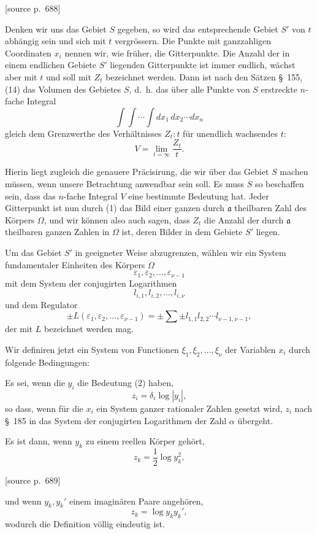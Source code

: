 \documentclass[11pt]{article}
\newcommand{\srcpage}[1]{\par\medskip\noindent\textsf{[source p.~#1]}\par\smallskip}
\begin{document}
\srcpage{688}
Denken wir uns das Gebiet $S$ gegeben, so wird das entsprechende Gebiet $S'$ von $t$ abhängig sein und sich mit $t$ vergrössern. Die Punkte mit ganzzahligen Coordinaten $x_i$ nennen wir, wie früher, die Gitterpunkte. Die Anzahl der in einem endlichen Gebiete $S'$ liegenden Gitterpunkte ist immer endlich, wächst aber mit $t$ und soll mit $Z_t$ bezeichnet werden. Dann ist nach den Sätzen \S~155, (14) das Volumen des Gebietes $S$, d.~h. das über alle Punkte von $S$ erstreckte $n$-fache Integral
\[
\int\!\int\cdots\int dx_1\,dx_2\cdots dx_n
\]
gleich dem Grenzwerthe des Verhältnisses $Z_t:t$ für unendlich wachsendes $t$:
\begin{equation}
V=\lim_{t=\infty}\frac{Z_t}{t}.
\tag{5}
\end{equation}

Hierin liegt zugleich die genauere Präcisirung, die wir über das Gebiet $S$ machen müssen, wenn unsere Betrachtung anwendbar sein soll. Es muss $S$ so beschaffen sein, dass das $n$-fache Integral $V$ eine bestimmte Bedeutung hat. Jeder Gitterpunkt ist nun durch (1) das Bild einer ganzen durch $\mathfrak a$ theilbaren Zahl des Körpers $\Omega$, und wir können also auch sagen, dass $Z_t$ die Anzahl der durch $\mathfrak a$ theilbaren ganzen Zahlen in $\Omega$ ist, deren Bilder in dem Gebiete $S'$ liegen.

Um das Gebiet $S'$ in geeigneter Weise abzugrenzen, wählen wir ein System fundamentaler Einheiten des Körpers $\Omega$
\[
\varepsilon_1,\varepsilon_2,\ldots,\varepsilon_{\nu-1}
\]
mit dem System der conjugirten Logarithmen
\[
l_{i,1},l_{i,2},\ldots,l_{i,\nu}
\]
und dem Regulator
\begin{equation}
\pm L(\varepsilon_1,\varepsilon_2,\ldots,\varepsilon_{\nu-1})=\pm\sum\pm l_{1,1}l_{2,2}\cdots l_{\nu-1,\nu-1},
\tag{6}
\end{equation}
der mit $L$ bezeichnet werden mag.

Wir definiren jetzt ein System von Functionen $\xi_1,\xi_2,\ldots,\xi_\nu$ der Variablen $x_i$ durch folgende Bedingungen:

Es sei, wenn die $y_i$ die Bedeutung (2) haben,
\begin{equation}
z_i=\delta_i\log|y_i|,
\tag{7}
\end{equation}
so dass, wenn für die $x_i$ ein System ganzer rationaler Zahlen gesetzt wird, $z_i$ nach \S~185 in das System der conjugirten Logarithmen der Zahl $\alpha$ übergeht.

Es ist dann, wenn $y_k$ zu einem reellen Körper gehört,
\begin{equation}
z_k=\frac12\log y_k^2,
\tag{8}
\end{equation}
\srcpage{689}
und wenn $y_k,y_k'$ einem imaginären Paare angehören,
\begin{equation}
z_k=\log y_ky_k',
\tag{9}
\end{equation}
wodurch die Definition völlig eindeutig ist.
\end{document}
